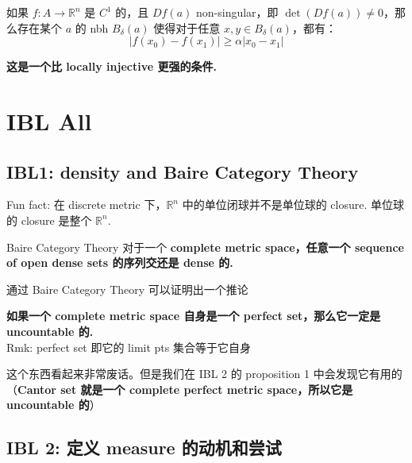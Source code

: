 \documentclass[lang=cn,11pt]{elegantbook}
\begin{document}
\begin{lemma}
    如果 $f: A \rightarrow \mathbb{R}^n$ 是 $C^1$ 的，且 $Df(a)$ non-singular，即 $\det(Df(a)) \not = 0$，那么存在某个 $a$ 的 nbh $B_{\delta} (a)$ 使得对于任意 $x,y \in B_{\delta}(a)$，都有：
    $$
    |f(x_0) - f(x_1)| \geq \alpha |x_0 - x_1|
    $$
\end{lemma}
\begin{note}
 \textbf{这是一个比 locally injective 更强的条件.}
\end{note}















\chapter{IBL All}

\section{IBL1: density and Baire Category Theory}

\begin{remark}
    Fun fact: 在 discrete metric 下，$\mathbb{R}^n$ 中的单位闭球并不是单位球的 closure. 单位球的 closure 是整个 $\mathbb{R}^n$.
\end{remark}


\begin{theorem}{Baire Category Theory} \label{Baire Category Theory}
    对于一个\textbf{ complete metric space，任意一个 sequence of open dense sets 的序列交还是 dense 的.}
\end{theorem}

通过 Baire Category Theory 可以证明出一个推论
\begin{corollary}
    \textbf{如果一个 complete metric space 自身是一个 perfect set，那么它一定是 uncountable 的. }
    \\Rmk: perfect set 即它的 limit pts 集合等于它自身
\end{corollary}

   这个东西看起来非常废话。但是我们在 IBL 2 的 proposition 1 中会发现它有用的（\textbf{Cantor set 就是一个 complete perfect metric space，所以它是 uncountable 的}）


\section{IBL 2: 定义 measure 的动机和尝试}
\end{document}
